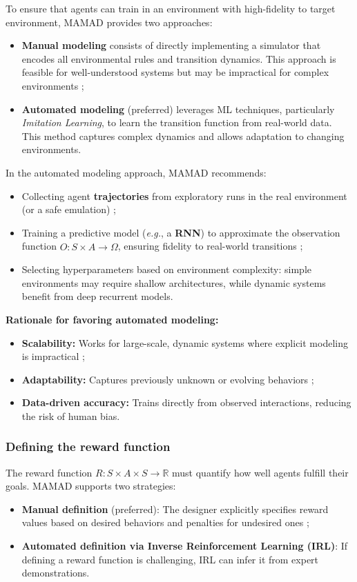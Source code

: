 \documentclass[pdflatex,sn-mathphys-num]{sn-jnl}%
\theoremstyle{thmstyleone}%
\theoremstyle{thmstyletwo}%
\theoremstyle{thmstylethree}%
\begin{document}
To ensure that agents can train in an environment with high-fidelity to target environment, MAMAD provides two approaches:
\begin{itemize}
    \item \textbf{Manual modeling} consists of directly implementing a simulator that encodes all environmental rules and transition dynamics. This approach is feasible for well-understood systems but may be impractical for complex environments ;
    \item \textbf{Automated modeling} (preferred) leverages ML techniques, particularly \textit{Imitation Learning}, to learn the transition function from real-world data. This method captures complex dynamics and allows adaptation to changing environments.
\end{itemize}

In the automated modeling approach, MAMAD recommends:
\begin{itemize}
    \item Collecting agent \textbf{trajectories} from exploratory runs in the real environment (or a safe emulation) ;
    \item Training a predictive model (\textit{e.g.}, a \textbf{RNN}) to approximate the observation function $\hat{O}: S \times A \to \Omega$, ensuring fidelity to real-world transitions ;
    \item Selecting hyperparameters based on environment complexity: simple environments may require shallow architectures, while dynamic systems benefit from deep recurrent models.
\end{itemize}

\noindent \textbf{Rationale for favoring automated modeling:}
\begin{itemize}
    \item \textbf{Scalability:} Works for large-scale, dynamic systems where explicit modeling is impractical ;
    \item \textbf{Adaptability:} Captures previously unknown or evolving behaviors ;
    \item \textbf{Data-driven accuracy:} Trains directly from observed interactions, reducing the risk of human bias.
\end{itemize}

\subsubsection{Defining the reward function}
The reward function $R: S \times A \times S \to \mathbb{R}$ must quantify how well agents fulfill their goals. MAMAD supports two strategies:
\begin{itemize}
    \item \textbf{Manual definition} (preferred): The designer explicitly specifies reward values based on desired behaviors and penalties for undesired ones ;
    \item \textbf{Automated definition via Inverse Reinforcement Learning (IRL)}: If defining a reward function is challenging, IRL can infer it from expert demonstrations.
\end{itemize}
\end{document}
